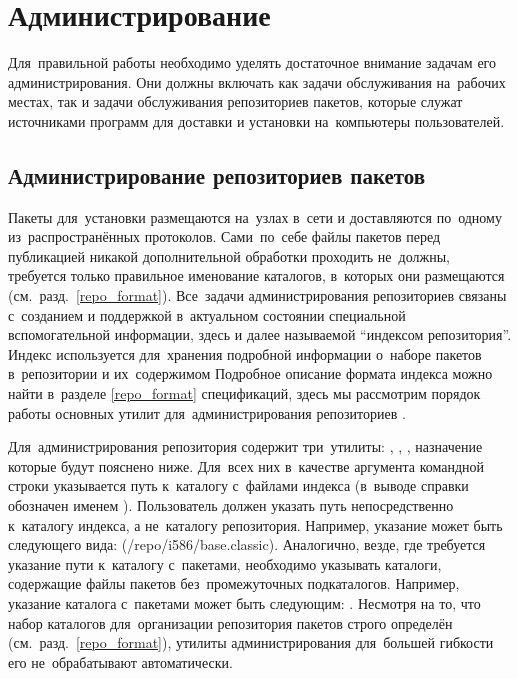 
\section{Администрирование \ds}

Для~правильной работы \ds необходимо уделять достаточное внимание задачам его администрирования.
Они должны включать как задачи обслуживания \ds на~рабочих местах, так и задачи обслуживания репозиториев пакетов,
которые служат источниками программ для доставки и установки на~компьютеры пользователей.

\subsection{Администрирование репозиториев пакетов}

Пакеты для~установки размещаются на~узлах в~сети и доставляются по~одному из~распространённых протоколов.
Сами~по~себе файлы пакетов перед публикацией никакой дополнительной обработки проходить не~должны,
требуется только правильное именование каталогов, в~которых они размещаются (см.~разд.~\ref{repo_format}).
Все~задачи администрирования репозиториев связаны с~созданием и поддержкой в~актуальном состоянии специальной вспомогательной информации,
здесь и далее называемой ``индексом  репозитория''.
Индекс используется для~хранения подробной информации о~наборе пакетов в~репозитории и их~содержимом
Подробное описание формата индекса можно найти в~разделе \ref{repo_format} спецификаций,
здесь мы рассмотрим порядок работы основных утилит для~администрирования репозиториев \ds.

Для~администрирования репозитория \ds  содержит три~утилиты:
,
,
,
назначение которые будут пояснено ниже.
Для~всех них в~качестве аргумента командной строки указывается путь к~каталогу с~файлами индекса (в~выводе справки обозначен именем ).
Пользователь должен указать путь непосредственно к~каталогу индекса,
а не~каталогу репозитория. 
Например, указание может быть следующего вида: \PATH(/repo/i586/base.classic). 
Аналогично, везде, где требуется указание пути к~каталогу с~пакетами, необходимо указывать каталоги,
содержащие файлы пакетов без~промежуточных подкаталогов.
Например, указание каталога с~пакетами может быть следующим: .
Несмотря на то, что набор каталогов для~организации репозитория пакетов \ds строго определён (см.~разд.~\ref{repo_format}),
утилиты администрирования  для~большей гибкости его не~обрабатывают автоматически.

